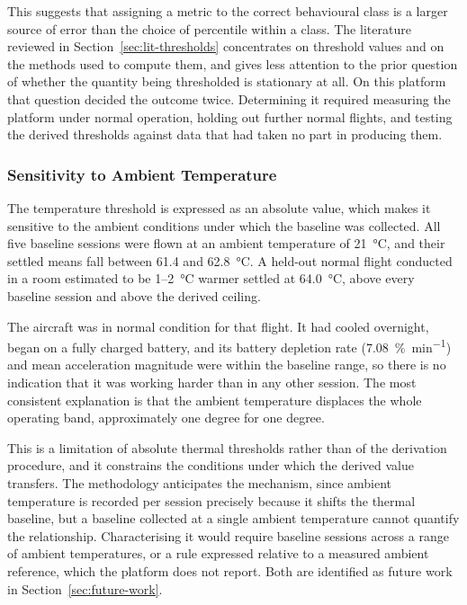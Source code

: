 This suggests that assigning a metric to the correct behavioural class is a
larger source of error than the choice of percentile within a class. The
literature reviewed in Section~\ref{sec:lit-thresholds} concentrates on
threshold values and on the methods used to compute them, and gives less
attention to the prior question of whether the quantity being thresholded is
stationary at all. On this platform that question decided the outcome twice.
Determining it required measuring the platform under normal operation, holding
out further normal flights, and testing the derived thresholds against data that
had taken no part in producing them.

\subsubsection{Sensitivity to Ambient Temperature}\label{sec:rq2-ambient}

The temperature threshold is expressed as an absolute value, which makes it
sensitive to the ambient conditions under which the baseline was collected. All
five baseline sessions were flown at an ambient temperature of
\SI{21}{\celsius}, and their settled means fall between \SI{61.4}{} and
\SI{62.8}{\celsius}. A held-out normal flight conducted in a room estimated to
be \SI{1}{}--\SI{2}{\celsius} warmer settled at \SI{64.0}{\celsius}, above
every baseline session and above the derived ceiling.

The aircraft was in normal condition for that flight. It had cooled overnight,
began on a fully charged battery, and its battery depletion rate
(\SI{7.08}{\percent\per\minute}) and mean acceleration magnitude were within the
baseline range, so there is no indication that it was working harder than in any
other session. The most consistent explanation is that the ambient temperature
displaces the whole operating band, approximately one degree for one degree.

This is a limitation of absolute thermal thresholds rather than of the
derivation procedure, and it constrains the conditions under which the derived
value transfers. The methodology anticipates the mechanism, since ambient
temperature is recorded per session precisely because it shifts the thermal
baseline, but a baseline collected at a single ambient temperature cannot
quantify the relationship. Characterising it would require baseline sessions
across a range of ambient temperatures, or a rule expressed relative to a
measured ambient reference, which the platform does not report. Both are
identified as future work in Section~\ref{sec:future-work}.

